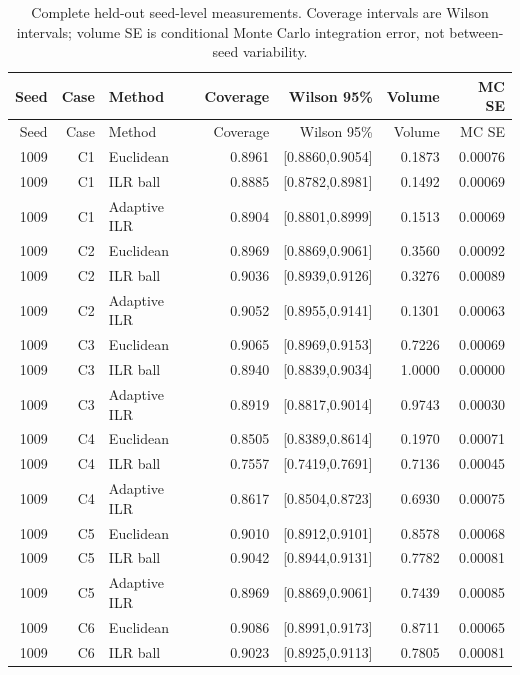 \documentclass{article}
\begin{document}
{\footnotesize\setlength{\tabcolsep}{3pt}%
\begin{longtable}{rrlrrrr}
\caption{Complete held-out seed-level measurements. Coverage intervals are Wilson intervals; volume SE is conditional Monte Carlo integration error, not between-seed variability.}\\
\toprule
Seed & Case & Method & Coverage & Wilson 95\% & Volume & MC SE \\
\midrule\endfirsthead
\toprule Seed & Case & Method & Coverage & Wilson 95\% & Volume & MC SE \\ \midrule\endhead
1009 & C1 & Euclidean & 0.8961 & [0.8860,0.9054] & 0.1873 & 0.00076 \\
1009 & C1 & ILR ball & 0.8885 & [0.8782,0.8981] & 0.1492 & 0.00069 \\
1009 & C1 & Adaptive ILR & 0.8904 & [0.8801,0.8999] & 0.1513 & 0.00069 \\
1009 & C2 & Euclidean & 0.8969 & [0.8869,0.9061] & 0.3560 & 0.00092 \\
1009 & C2 & ILR ball & 0.9036 & [0.8939,0.9126] & 0.3276 & 0.00089 \\
1009 & C2 & Adaptive ILR & 0.9052 & [0.8955,0.9141] & 0.1301 & 0.00063 \\
1009 & C3 & Euclidean & 0.9065 & [0.8969,0.9153] & 0.7226 & 0.00069 \\
1009 & C3 & ILR ball & 0.8940 & [0.8839,0.9034] & 1.0000 & 0.00000 \\
1009 & C3 & Adaptive ILR & 0.8919 & [0.8817,0.9014] & 0.9743 & 0.00030 \\
1009 & C4 & Euclidean & 0.8505 & [0.8389,0.8614] & 0.1970 & 0.00071 \\
1009 & C4 & ILR ball & 0.7557 & [0.7419,0.7691] & 0.7136 & 0.00045 \\
1009 & C4 & Adaptive ILR & 0.8617 & [0.8504,0.8723] & 0.6930 & 0.00075 \\
1009 & C5 & Euclidean & 0.9010 & [0.8912,0.9101] & 0.8578 & 0.00068 \\
1009 & C5 & ILR ball & 0.9042 & [0.8944,0.9131] & 0.7782 & 0.00081 \\
1009 & C5 & Adaptive ILR & 0.8969 & [0.8869,0.9061] & 0.7439 & 0.00085 \\
1009 & C6 & Euclidean & 0.9086 & [0.8991,0.9173] & 0.8711 & 0.00065 \\
1009 & C6 & ILR ball & 0.9023 & [0.8925,0.9113] & 0.7805 & 0.00081 \\

\end{longtable}}
\end{document}
